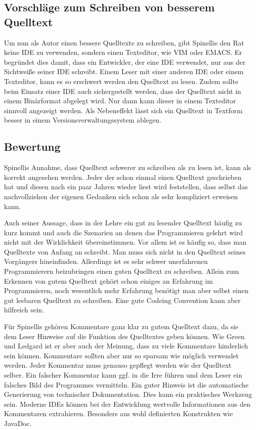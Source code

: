 \subsection{Vorschläge zum Schreiben von besserem Quelltext}
Um nun als Autor einen bessere Quelltexte zu schreiben, gibt Spinellis den Rat keine IDE zu verwenden, sondern einen Texteditor, wie VIM oder EMACS. Er begründet dies damit, dass ein Entwickler, der eine IDE verwendet, nur aus der Sichtweiße seiner IDE schreibt. Einem Leser mit einer anderen IDE oder einem Texteditor, kann es so erschwert werden den Quelltext zu lesen. Zudem sollte beim Einsatz einer IDE auch sichergestellt werden, dass der Quelltext nicht in einem Binärformat abgelegt wird. Nur dann kann dieser in einem Texteditor sinnvoll angezeigt werden. Als Nebeneffekt lässt sich ein Quelltext in Textform besser in einem Versionsverwaltungssystem ablegen. \cite[S. 88]{Spinellis}

\subsection{Bewertung}
Spinellis Annahme, dass Quelltext schwerer zu schreiben als zu lesen ist, kann als korrekt angesehen werden. Jeder der schon einmal einen Quelltext geschrieben hat und diesen nach ein paar Jahren wieder liest wird feststellen, dass selbst das nachvollziehen der eigenen Gedanken sich schon als sehr kompliziert erweisen kann.

Auch seiner Aussage, dass in der Lehre ein gut zu lesender Quelltext häufig zu kurz kommt und auch die Szenarien an denen das Programmieren gelehrt wird nicht mit der Wirklichkeit übereinstimmen. Vor allem ist es häufig so, dass man Quelltexte von Anfang an schreibt. Man muss sich nicht in den Quelltext seines Vorgängers hineinfinden. Allerdings ist es sehr schwer unerfahrenen Programmierern beizubringen einen guten Quelltext zu schreiben. Allein zum Erkennen von gutem Quelltext gehört schon einiges an Erfahrung im Programmieren, noch wesentlich mehr Erfahrung benötigt man aber selbst einen gut lesbaren Quelltext zu schreiben. Eine gute Codeing Convention kann aber hilfreich sein.

Für Spinellis gehören Kommentare ganz klar zu gutem Quelltext dazu, da sie dem Leser Hinweise auf die Funktion des Quelltextes geben können. Wie Green und Ledgard ist er aber auch der Meinung, dass zu viele Kommentare hinderlich sein können. Kommentare sollten aber nur so sparsam wie möglich verwendet werden. Jeder Kommentar muss genauso gepflegt werden wie der Quelltext selber. Ein falscher Kommentar kann ggf. in die Irre führen und dem Leser ein falsches Bild des Programmes vermitteln. Ein guter Hinweis ist die automatische Generierung von technischer Dokumentation. Dies kann ein praktisches Werkzeug sein. Moderne IDEs können bei der Entwicklung wertvolle Informationen aus den Kommentaren extrahieren. Besonders aus wohl definierten Konstrukten wie JavaDoc.

